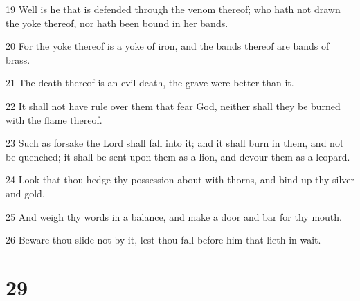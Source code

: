 \par 19 Well is he that is defended through the venom thereof; who hath not drawn the yoke thereof, nor hath been bound in her bands.
\par 20 For the yoke thereof is a yoke of iron, and the bands thereof are bands of brass.
\par 21 The death thereof is an evil death, the grave were better than it.
\par 22 It shall not have rule over them that fear God, neither shall they be burned with the flame thereof.
\par 23 Such as forsake the Lord shall fall into it; and it shall burn in them, and not be quenched; it shall be sent upon them as a lion, and devour them as a leopard.
\par 24 Look that thou hedge thy possession about with thorns, and bind up thy silver and gold,
\par 25 And weigh thy words in a balance, and make a door and bar for thy mouth.
\par 26 Beware thou slide not by it, lest thou fall before him that lieth in wait.

\chapter{29}


